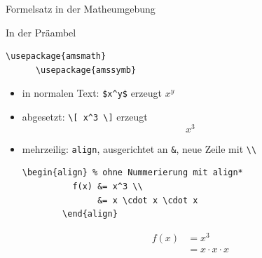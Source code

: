 \begin{Frame}[fragile]{Formelsatz in der Matheumgebung}
  \begin{Block}{In der Präambel}
    \begin{lstlisting}[gobble=6,style=block]
      \usepackage{amsmath}
      \usepackage{amssymb}
    \end{lstlisting}
  \end{Block}
  
  \begin{itemize}
    \item in normalen Text: \lstinline-$x^y$- erzeugt $x^y$
    \item abgesetzt: \lstinline-\[ x^3 \]- erzeugt
      \[ x^3 \]
    \item mehrzeilig: \lstinline-align-, ausgerichtet an \lstinline-&-, neue Zeile mit \lstinline-\\- 
      \begin{lstlisting}[gobble=8]
        \begin{align} % ohne Nummerierung mit align*
          f(x) &= x^3 \\
               &= x \cdot x \cdot x
        \end{align}
      \end{lstlisting}
      \begin{align}
        f(x) &= x^3 \\
             &= x \cdot x \cdot x
      \end{align}
  \end{itemize}
\end{Frame}

